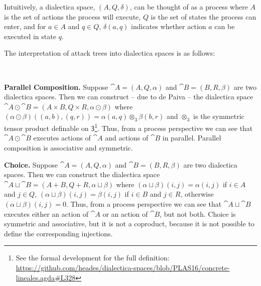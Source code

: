 Intuitively, a dialectica space, $(A , Q, \delta)$, can be thought of
as a process where $A$ is the set of actions the process will execute,
$Q$ is the set of states the process can enter, and for $a \in A$ and
$q \in Q$, $\delta(a , q)$ indicates whether action $a$ can be
executed in state $q$.

The interpretation of attack trees into dialectica spaces is as
follows: {\vspace{-8pt}\ \\
\begin{changemargin}{2pt}{2pt}\noindent
\textbf{Parallel Composition.} Suppose $\cat{A} = (A , Q, \alpha)$ and
$\cat{B} = (B , R , \beta)$ are two dialectica spaces.  Then we can
construct -- due to de Paiva \cite{dePaiva:2014a} -- the dialectica
space $\cat{A} \odot \cat{B} = (A \times B, Q \times R, \alpha \odot
\beta)$ where $(\alpha \odot \beta)((a,b) , (q,r)) = \alpha(a , q)
\otimes_3 \beta(b , r)$ and $\otimes_3$ is the symmetric tensor
product definable on $\mathsf{3}$\footnote{See the formal development
  for the full definition:
  \url{https://github.com/heades/dialectica-spaces/blob/PLAS16/concrete-lineales.agda\#L328}}.
Thus, from a process perspective we can see that $\cat{A} \odot
\cat{B}$ executes actions of $\cat{A}$ and actions of $\cat{B}$ in
parallel.  Parallel composition is associative and symmetric.
\end{changemargin}

\begin{changemargin}{2pt}{2pt}\noindent
\textbf{Choice.} Suppose $\cat{A} = (A , Q, \alpha)$ and $\cat{B} = (B
, R , \beta)$ are two dialectica spaces.  Then we can construct the
dialectica space $\cat{A} \sqcup \cat{B} = (A + B, Q + R, \alpha
\sqcup \beta)$ where $(\alpha \sqcup \beta)(i , j) = \alpha(i , j)$ if
$i \in A$ and $j \in Q$, $(\alpha \sqcup \beta)(i , j) = \beta(i , j)$ if
$i \in B$ and $j \in R$, otherwise $(\alpha \sqcup \beta)(i , j) = 0$.
Thus, from a process perspective we can see that $\cat{A} \sqcup
\cat{B}$ executes either an action of $\cat{A}$ or an action of
$\cat{B}$, but not both.  Choice is symmetric and associative, but it
is not a coproduct, because it is not possible to define the
corresponding injections.  %
\end{changemargin}

}
